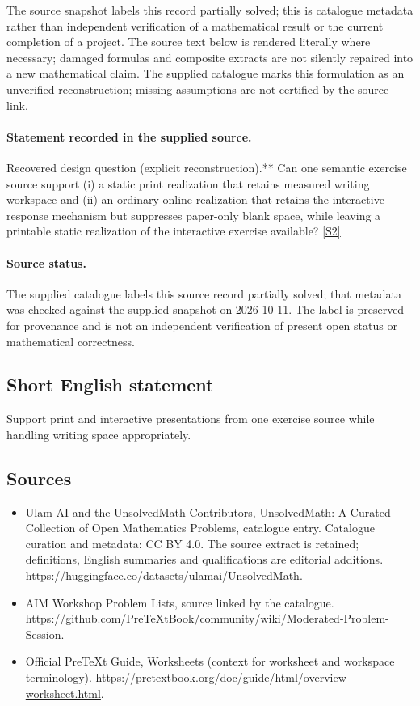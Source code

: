 \documentclass[11pt]{article}
\begin{document}
The source snapshot labels this record partially solved; this is catalogue metadata rather than independent verification of a mathematical result or the current completion of a project.
The source text below is rendered literally where necessary; damaged formulas and composite extracts are not silently repaired into a new mathematical claim.
The supplied catalogue marks this formulation as an unverified reconstruction; missing assumptions are not certified by the source link.
\paragraph{Statement recorded in the supplied source.}
Recovered design question (explicit reconstruction).** Can one semantic exercise source support (i) a static print realization that retains measured writing workspace and (ii) an ordinary online realization that retains the interactive response mechanism but suppresses paper-only blank space, while leaving a printable static realization of the interactive exercise available? \href{https://github.com/PreTeXtBook/community/wiki/Moderated-Problem-Session}{[S2]}
\paragraph{Source status.}
The supplied catalogue labels this source record partially solved; that metadata was checked against the supplied snapshot on 2026-10-11. The label is preserved for provenance and is not an independent verification of present open status or mathematical correctness.
\subsection{Short English statement}
Support print and interactive presentations from one exercise source while handling writing space appropriately.
\subsection{Sources}
\begin{itemize}
\item[S1] Ulam AI and the UnsolvedMath Contributors, UnsolvedMath: A Curated Collection of Open Mathematics Problems, catalogue entry. Catalogue curation and metadata: CC BY 4.0. The source extract is retained; definitions, English summaries and qualifications are editorial additions.
\url{https://huggingface.co/datasets/ulamai/UnsolvedMath}.
\item[S2] AIM Workshop Problem Lists, source linked by the catalogue.
\url{https://github.com/PreTeXtBook/community/wiki/Moderated-Problem-Session}.
\item[S3] Official PreTeXt Guide, Worksheets (context for worksheet and workspace terminology).
\url{https://pretextbook.org/doc/guide/html/overview-worksheet.html}.
\end{itemize}
\end{document}
